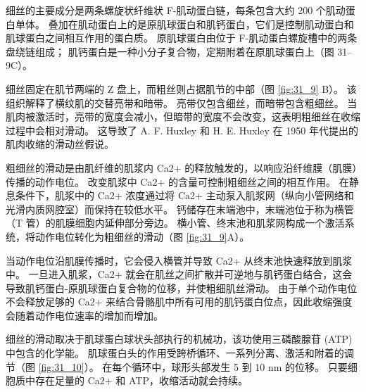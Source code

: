细丝的主要成分是两条螺旋状纤维状 F-肌动蛋白链，每条包含大约 200 个肌动蛋白单体。
叠加在肌动蛋白上的是原肌球蛋白和肌钙蛋白，它们是控制肌动蛋白和肌球蛋白之间相互作用的蛋白质。
原肌球蛋白由位于 F-肌动蛋白螺旋槽中的两条盘绕链组成；
肌钙蛋白是一种小分子复合物，定期附着在原肌球蛋白上（图 31–9C）。


细丝固定在肌节两端的 Z 盘上，而粗丝则占据肌节的中部（图 \ref{fig:31_9} B）。
该组织解释了横纹肌的交替亮带和暗带。
亮带仅包含细丝，而暗带包含粗细丝。
当肌肉被激活时，亮带的宽度会减小，但暗带的宽度不会改变，这表明粗细丝在收缩过程中会相对滑动。
这导致了 A. F. Huxley 和 H. E. Huxley 在 1950 年代提出的肌肉收缩的滑动丝假说。


粗细丝的滑动是由肌纤维的肌浆内 Ca2+ 的释放触发的，以响应沿纤维膜（肌膜）传播的动作电位。
改变肌浆中 Ca2+ 的含量可控制粗细丝之间的相互作用。
在静息条件下，肌浆中的 Ca2+ 浓度通过将 Ca2+ 主动泵入肌浆网（纵向小管网络和光滑内质网腔室）而保持在较低水平。
钙储存在末端池中，末端池位于称为横管（T 管）的肌膜细胞内延伸部分旁边。
横小管、终末池和肌浆网构成一个激活系统，将动作电位转化为粗细丝的滑动（图 \ref{fig:31_9}A）。


当动作电位沿肌膜传播时，它会侵入横管并导致 Ca2+ 从终末池快速释放到肌浆中。
一旦进入肌浆，Ca2+ 就会在肌丝之间扩散并可逆地与肌钙蛋白结合，这会导致肌钙蛋白-原肌球蛋白复合物的位移，并使粗细肌丝滑动。
由于单个动作电位不会释放足够的 Ca2+ 来结合骨骼肌中所有可用的肌钙蛋白位点，因此收缩强度会随着动作电位速率的增加而增加。


细丝的滑动取决于肌球蛋白球状头部执行的机械功，该功使用三磷酸腺苷 (ATP) 中包含的化学能。
肌球蛋白头的作用受跨桥循环、一系列分离、激活和附着的调节（图 \ref{fig:31_10}）。
在每个循环中，球形头部发生 5 到 10 nm 的位移。
只要细胞质中存在足量的 Ca2+ 和 ATP，收缩活动就会持续。


